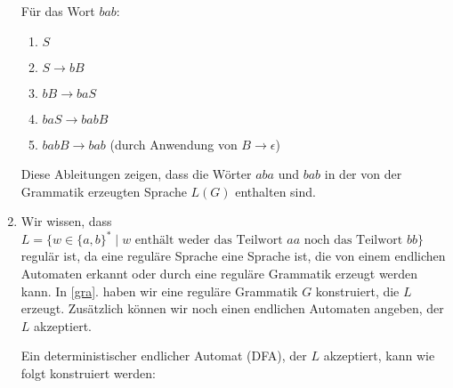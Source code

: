 \documentclass{uebungsblatt}
\begin{document}
\begin{loesung}
\begin{enumerate}
		      Für das Wort $bab$:

		      \begin{enumerate}
			      \item $S$
			      \item $S \rightarrow bB$
			      \item $bB \rightarrow baS$
			      \item $baS \rightarrow babB$
			      \item $babB \rightarrow bab$ (durch Anwendung von $B \rightarrow \epsilon$)
		      \end{enumerate}

		      Diese Ableitungen zeigen, dass die Wörter $aba$ und $bab$ in der von der Grammatik erzeugten Sprache $L(G)$ enthalten sind.


		\item
		      Wir wissen, dass $L = \{ w \in \{a, b\}^* \mid w \text{ enthält weder das Teilwort } aa \text{ noch das Teilwort } bb \} $ regulär ist, da eine reguläre Sprache eine Sprache ist, die von einem endlichen Automaten erkannt oder durch eine reguläre Grammatik erzeugt werden kann. In \ref{gra}. haben wir eine reguläre Grammatik $G$ konstruiert, die $L$ erzeugt. Zusätzlich können wir noch einen endlichen Automaten angeben, der $L$ akzeptiert.

		      Ein deterministischer endlicher Automat (DFA), der $L$ akzeptiert, kann wie folgt konstruiert werden:


\end{enumerate}
\end{loesung}
\end{document}
